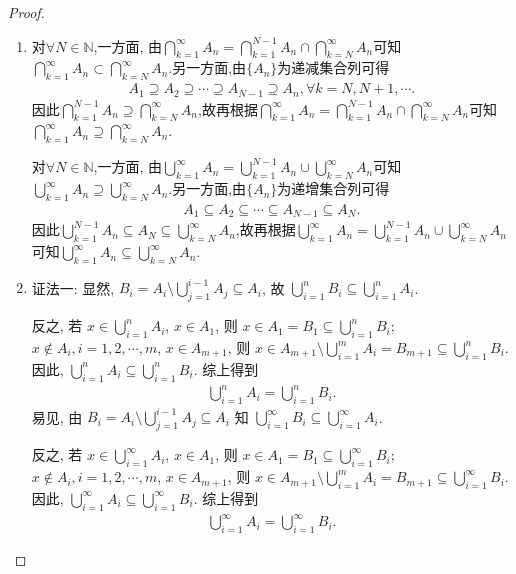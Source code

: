 \documentclass[../../main.tex]{subfiles}%
\begin{document}
\begin{proof}
\begin{enumerate}[(1)]
\item 对$\forall N\in \mathbb{N}$,一方面,
由$\bigcap_{k=1}^{\infty}{A_n}=\bigcap_{k=1}^{N-1}{A_n}\cap \bigcap_{k=N}^{\infty}{A_n}$可知$\bigcap_{k=1}^{\infty}{A_n}\subset \bigcap_{k=N}^{\infty}{A_n}$.另一方面,由$\{A_n\}$为递减集合列可得
\begin{align*}
A_1\supseteq A_2\supseteq \cdots \supseteq A_{N-1}\supseteq A_n,\forall k=N,N+1,\cdots .
\end{align*}
因此$\bigcap_{k=1}^{N-1}{A_n}\supseteq \bigcap_{k=N}^{\infty}{A_n}$,故再根据$\bigcap_{k=1}^{\infty}{A_n}=\bigcap_{k=1}^{N-1}{A_n}\cap \bigcap_{k=N}^{\infty}{A_n}$可知$\bigcap_{k=1}^{\infty}{A_n}\supseteq \bigcap_{k=N}^{\infty}{A_n}$.

对$\forall N\in \mathbb{N}$,一方面,
由$\bigcup_{k=1}^{\infty}{A_n}=\bigcup_{k=1}^{N-1}{A_n}\cup \bigcup_{k=N}^{\infty}{A_n}$可知$\bigcup_{k=1}^{\infty}{A_n}\supseteq \bigcup_{k=N}^{\infty}{A_n}$.另一方面,由$\{A_n\}$为递增集合列可得
\begin{align*}
A_1\subseteq A_2\subseteq \cdots \subseteq A_{N-1}\subseteq A_N.
\end{align*}
因此$\bigcup_{k=1}^{N-1}{A_n}\subseteq A_N \subseteq \bigcup_{k=N}^{\infty}{A_n}$,故再根据$\bigcup_{k=1}^{\infty}{A_n}=\bigcup_{k=1}^{N-1}{A_n}\cup \bigcup_{k=N}^{\infty}{A_n}$可知$\bigcup_{k=1}^{\infty}{A_n}\subseteq \bigcup_{k=N}^{\infty}{A_n}$.

\item {\color{blue}证法一:}
显然, $B_i = A_i \setminus \bigcup_{j=1}^{i-1} A_j \subseteq A_i$, 故 $\bigcup_{i=1}^{n} B_i \subseteq \bigcup_{i=1}^{n} A_i$.

反之, 若 $x \in \bigcup_{i=1}^{n} A_i$, \one $x \in A_1$, 则 $x \in A_1 = B_1 \subseteq \bigcup_{i=1}^{n} B_i$; \two $x \notin A_i, i=1,2,\cdots,m$, $x \in A_{m+1}$, 则 $x \in A_{m+1} \setminus \bigcup_{i=1}^{m} A_i = B_{m+1} \subseteq \bigcup_{i=1}^{n} B_i$. 因此, $\bigcup_{i=1}^{n} A_i \subseteq \bigcup_{i=1}^{n} B_i$.
综上得到
\begin{align*}
\bigcup_{i=1}^{n} A_i = \bigcup_{i=1}^{n} B_i.
\end{align*}
易见, 由 $B_i = A_i \setminus \bigcup_{j=1}^{i-1} A_j \subseteq A_i$ 知 $\bigcup_{i=1}^{\infty} B_i \subseteq \bigcup_{i=1}^{\infty} A_i$.

反之, 若 $x \in \bigcup_{i=1}^{\infty} A_i$, \one $x \in A_1$, 则 $x \in A_1 = B_1 \subseteq \bigcup_{i=1}^{\infty} B_i$; \two $x \notin A_i, i=1,2,\cdots,m$, $x \in A_{m+1}$, 则 $x \in A_{m+1} \setminus \bigcup_{i=1}^{m} A_i = B_{m+1} \subseteq \bigcup_{i=1}^{\infty} B_i$. 因此, $\bigcup_{i=1}^{\infty} A_i \subseteq \bigcup_{i=1}^{\infty} B_i$.
综上得到
\begin{align*}
\bigcup_{i=1}^{\infty} A_i = \bigcup_{i=1}^{\infty} B_i.
\end{align*}


\end{enumerate}
\end{proof}
\end{document}
